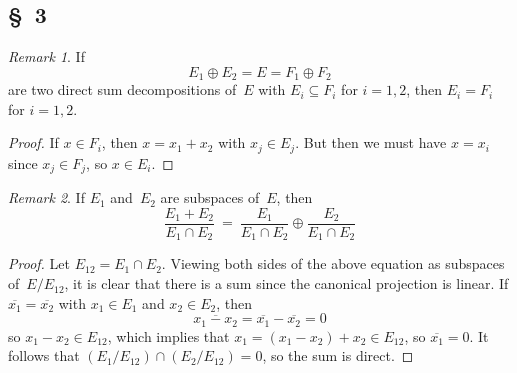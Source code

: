 \documentclass[letterpaper,12pt]{article}
\newcommand{\sect}{\cap}
\newcommand{\dsum}{\oplus}
\newcommand{\proj}[1]{\overline{#1}}
\theoremstyle{definition}
\theoremstyle{remark}
\newtheorem*{rmk}{Remark}
\begin{document}
\subsection*{\S~3}
\begin{rmk}
If
\[E_1\dsum E_2=E=F_1\dsum F_2\]
are two direct sum decompositions of~\(E\) with \(E_i\subseteq F_i\) for \(i=1,2\), then \(E_i=F_i\) for \(i=1,2\).
\end{rmk}
\begin{proof}
If \(x\in F_i\), then \(x=x_1+x_2\) with \(x_j\in E_j\). But then we must have \(x=x_i\) since \(x_j\in F_j\), so \(x\in E_i\).
\end{proof}

\begin{rmk}
If \(E_1\) and~\(E_2\) are subspaces of~\(E\), then
\[\frac{E_1+E_2}{E_1\sect E_2}\ =\ \frac{E_1}{E_1\sect E_2}\dsum\frac{E_2}{E_1\sect E_2}\]
\end{rmk}
\begin{proof}
Let \(E_{12}=E_1\sect E_2\). Viewing both sides of the above equation as subspaces of~\(E/E_{12}\), it is clear that there is a sum since the canonical projection is linear. If \(\proj{x_1}=\proj{x_2}\) with \(x_1\in E_1\) and \(x_2\in E_2\), then
\[\proj{x_1-x_2}=\proj{x_1}-\proj{x_2}=0\]
so \(x_1-x_2\in E_{12}\), which implies that \(x_1=(x_1-x_2)+x_2\in E_{12}\), so \(\proj{x_1}=0\). It follows that \((E_1/E_{12})\sect(E_2/E_{12})=0\), so the sum is direct.
\end{proof}
\end{document}
